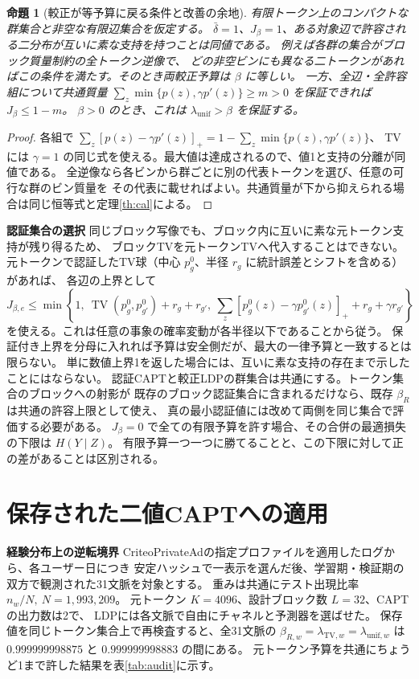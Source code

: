 \documentclass[a4paper,11pt]{ltjsarticle}
\theoremstyle{jp}
\newtheorem{prop}[thm]{命題}
\newcommand{\TV}{\operatorname{TV}}
\newcommand{\para}[1]{\par\Needspace{3\baselineskip}\addvspace{.6\baselineskip}\noindent\textbf{#1}\enspace}
\begin{document}
\begin{prop}[較正が等予算に戻る条件と改善の余地]\label{th:preimage}
有限トークン上のコンパクトな群集合と非空な有限辺集合を仮定する。
\(\bar\delta=1\)、\(J_\beta=1\)、ある対象辺で許容される二分布が互いに素な支持を持つことは同値である。
例えば各群の集合がブロック質量制約の\emph{全トークン逆像}で、
どの非空ビンにも異なる二トークンがあればこの条件を満たす。そのとき両較正予算は \(\beta\) に等しい。
一方、全辺・全許容組について共通質量
\(\sum_z\min\{p(z),\gamma p'(z)\}\ge m>0\) を保証できれば \(J_\beta\le1-m\)。
\(\beta>0\) のとき、これは \(\lambda_{\mathrm{unif}}>\beta\) を保証する。
\end{prop}
\begin{proof}
各組で \(\sum_z[p(z)-\gamma p'(z)]_+=1-\sum_z\min\{p(z),\gamma p'(z)\}\)、
TVには \(\gamma=1\) の同じ式を使える。最大値は達成されるので、値1と支持の分離が同値である。
全逆像なら各ビンから群ごとに別の代表トークンを選び、任意の可行な群のビン質量を
その代表に載せればよい。共通質量が下から抑えられる場合は同じ恒等式と定理\ref{th:cal}による。
\end{proof}

\para{認証集合の選択}
同じブロック写像でも、ブロック内に互いに素な元トークン支持が残り得るため、
ブロックTVを元トークンTVへ代入することはできない。
元トークンで認証したTV球（中心 \(p_g^0\)、半径 \(r_g\) に統計誤差とシフトを含める）があれば、
各辺の上界として
\[
 J_{\beta,e}\le\min\!\left\{1,\ \TV(p_g^0,p_{g'}^0)+r_g+r_{g'},
 \ \sum_z[p_g^0(z)-\gamma p_{g'}^0(z)]_++r_g+\gamma r_{g'}\right\}
\]
を使える。これは任意の事象の確率変動が各半径以下であることから従う。
保証付き上界を分母に入れれば予算は安全側だが、最大の一律予算と一致するとは限らない。
単に数値上界1を返した場合には、互いに素な支持の存在まで示したことにはならない。
認証CAPTと較正LDPの群集合は共通にする。トークン集合のブロックへの射影が
既存のブロック認証集合に含まれるだけなら、既存 \(\beta_R\) は共通の許容上限として使え、
真の最小認証値には改めて両側を同じ集合で評価する必要がある。
\(J_\beta=0\) で全ての有限予算を許す場合、その合併の最適損失の下限は \(H(Y\mid Z)\)。
有限予算一つ一つに勝てることと、この下限に対して正の差があることは区別される。

\section{保存された二値CAPTへの適用}

\para{経験分布上の逆転境界}
CriteoPrivateAdの指定プロファイルを適用したログから、各ユーザー日につき
安定ハッシュで一表示を選んだ後、学習期・検証期の双方で観測された31文脈を対象とする。
重みは共通にテスト出現比率 \(n_w/N,\ N=1{,}993{,}209\)。
元トークン \(K=4096\)、設計ブロック数 \(L=32\)、CAPTの出力数は2で、
LDPには各文脈で自由にチャネルと予測器を選ばせた。
保存値を同じトークン集合上で再検査すると、全31文脈の
\(\beta_{R,w}=\lambda_{{\mathrm{TV}},w}=\lambda_{{\mathrm{unif}},w}\) は
\(0.999999998875\) と \(0.999999998883\) の間にある。
元トークン予算を共通にちょうど1まで許した結果を表\ref{tab:audit}に示す。
\end{document}
